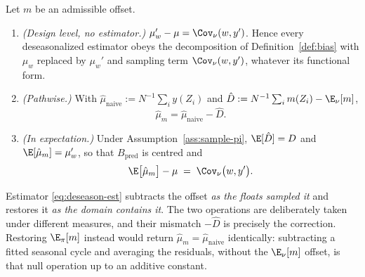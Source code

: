 \begin{proposition}
\label{prop:cv-cancel}
Let $m$ be an admissible offset.
\begin{enumerate}
\item \emph{(Design level, no estimator.)}
  $\mu_w'-\mu=\Cov_\nu(w,y')$. Hence every deseasonalized estimator
  obeys the decomposition of Definition~\ref{def:bias} with $\mu_w$
  replaced by $\mu_w'$ and sampling term $\Cov_\nu(w,y')$, whatever its
  functional form.
\item \emph{(Pathwise.)} With
  $\hat\mu_{\mathrm{naive}}:=N^{-1}\sum_i y(Z_i)$ and
  $\hat D:=N^{-1}\sum_i m(Z_i)-\E_\nu[m]$,
  \begin{equation}
    \hat\mu_m=\hat\mu_{\mathrm{naive}}-\hat D .
    \label{eq:cv-pathwise}
  \end{equation}
\item \emph{(In expectation.)} Under Assumption~\ref{ass:sample-pi},
  $\E[\hat D]=D$ and $\E[\hat\mu_m]=\mu_w'$, so that
  $B_{\mathrm{pred}}$ is centred and
  \[
    \E\big[\hat\mu_m\big]-\mu \;=\; \Cov_\nu\big(w,y'\big).
  \]
\end{enumerate}
\end{proposition}

\begin{remark}
\label{rem:cv-asymmetry}
Estimator \eqref{eq:deseason-est} subtracts the offset \emph{as the
floats sampled it} and restores it \emph{as the domain contains it}. The
two operations are deliberately taken under different measures, and
their mismatch $-\hat D$ is precisely the correction. Restoring
$\E_\pi[m]$ instead would return $\hat\mu_m=\hat\mu_{\mathrm{naive}}$
identically: subtracting a fitted seasonal cycle and averaging the
residuals, without the $\E_\nu[m]$ offset, is that null operation up to
an additive constant.
\end{remark}

